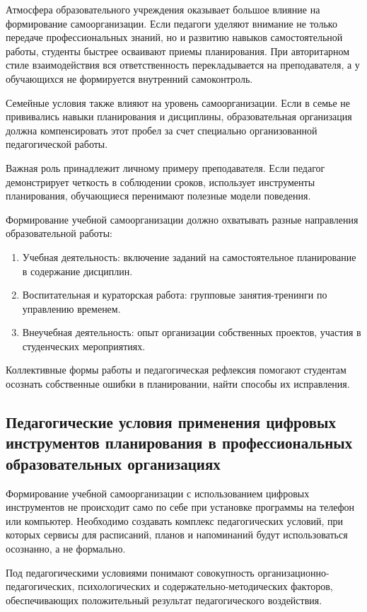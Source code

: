 \documentclass[14pt,a4paper]{article}
\begin{document}
Атмосфера образовательного учреждения оказывает большое влияние на формирование самоорганизации. Если педагоги уделяют внимание не только передаче профессиональных знаний, но и развитию навыков самостоятельной работы, студенты быстрее осваивают приемы планирования. При авторитарном стиле взаимодействия вся ответственность перекладывается на преподавателя, а у обучающихся не формируется внутренний самоконтроль.

Семейные условия также влияют на уровень самоорганизации. Если в семье не прививались навыки планирования и дисциплины, образовательная организация должна компенсировать этот пробел за счет специально организованной педагогической работы.

Важная роль принадлежит личному примеру преподавателя. Если педагог демонстрирует четкость в соблюдении сроков, использует инструменты планирования, обучающиеся перенимают полезные модели поведения.

Формирование учебной самоорганизации должно охватывать разные направления образовательной работы:
\begin{enumerate}
    \item Учебная деятельность: включение заданий на самостоятельное планирование в содержание дисциплин.
    \item Воспитательная и кураторская работа: групповые занятия-тренинги по управлению временем.
    \item Внеучебная деятельность: опыт организации собственных проектов, участия в студенческих мероприятиях.
\end{enumerate}

Коллективные формы работы и педагогическая рефлексия помогают студентам осознать собственные ошибки в планировании, найти способы их исправления.


\subsection{Педагогические условия применения цифровых инструментов планирования в профессиональных образовательных организациях}

Формирование учебной самоорганизации с использованием цифровых инструментов не происходит само по себе при установке программы на телефон или компьютер. Необходимо создавать комплекс педагогических условий, при которых сервисы для расписаний, планов и напоминаний будут использоваться осознанно, а не формально.

Под педагогическими условиями понимают совокупность организационно-педагогических, психологических и содержательно-методических факторов, обеспечивающих положительный результат педагогического воздействия.
\end{document}
